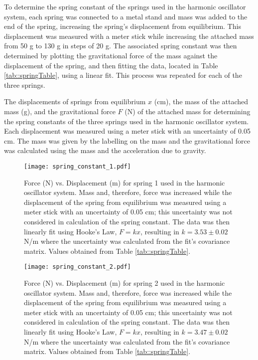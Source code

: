 To determine the spring constant of the springs used in the harmonic oscillator system, each spring was connected to a metal stand and mass was added to the end of the spring, increasing the spring's displacement from equilibrium. This displacement was measured with a meter stick while increasing the attached mass from 50 g to 130 g in steps of 20 g. The associated spring constant was then determined by plotting the gravitational force of the mass against the displacement of the spring, and then fitting the data, located in Table \ref{tab::springTable}, using a linear fit. This process was repeated for each of the three springs.

\begin{table}[H]
	\centering
	
	\caption{The displacements of springs from equilibrium $x$ (cm), the mass of the attached mass (g), and the gravitational force $F$ (N) of the attached mass for determining the spring constants of the three springs used in the harmonic oscillator system. Each displacement was measured using a meter stick with an uncertainty of 0.05 cm. The mass was given by the labelling on the mass and the gravitational force was calculated using the mass and the acceleration due to gravity.}
	\label{tab::springTable}
\end{table}


\begin{figure}[H]
    \centering
	\texttt{[image: spring\_constant\_1.pdf]}
	\label{fig::spring1}
	\caption{Force (N) vs. Displacement (m) for spring 1 used in the harmonic oscillator system. Mass and, therefore, force was increased while the displacement of the spring from equilibrium was measured using a meter stick with an uncertainty of 0.05 cm; this uncertainty was not considered in calculation of the spring constant. The data was then linearly fit using Hooke's Law, $F = kx$, resulting in $k = 3.53 \pm 0.02$ N/m where the uncertainty was calculated from the fit's covariance matrix. Values obtained from Table \ref{tab::springTable}.}
\end{figure}

\begin{figure}[H]
    \centering
	\texttt{[image: spring\_constant\_2.pdf]}
	\label{fig::spring2}
	\caption{Force (N) vs. Displacement (m) for spring 2 used in the harmonic oscillator system. Mass and, therefore, force was increased while the displacement of the spring from equilibrium was measured using a meter stick with an uncertainty of 0.05 cm; this uncertainty was not considered in calculation of the spring constant. The data was then linearly fit using Hooke's Law, $F = kx$, resulting in $k = 3.47 \pm 0.02$ N/m where the uncertainty was calculated from the fit's covariance matrix. Values obtained from Table \ref{tab::springTable}.}
\end{figure}

